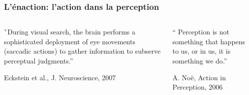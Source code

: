 \documentclass[10pt]{beamer}
\begin{document}
\begin{frame}
  \frametitle{L'\'enaction: l'action dans la perception}
\begin{columns}
    \begin{column}{0.5\textwidth}
  \begin{block}{}
\hspace*{0.2\textwidth}
\vspace{0.3cm}

    \``During visual search, the brain performs a sophisticated deployment of {\color {blue} {eye movements}} (saccadic actions) to gather information to subserve perceptual judgments.''\begin{flushright}
      {\footnotesize  Eckstein et al., J. Neuroscience, 2007 }
    \end{flushright}
  \end{block}
\end{column}
\begin{column}{0.5\textwidth}
 \begin{block}{}
``{\color {blue} {Perception}} is not something that happens to us, or in us, it is something {\color {blue} {we do}}.''
    \begin{flushright}
      {\footnotesize A. No\"e, Action in Perception, 2006}
    \end{flushright}
\vspace{0.5cm}
\hspace*{0.2\textwidth}
  \end{block}
\end{column}
\end{columns}

\end{frame}
\end{document}
